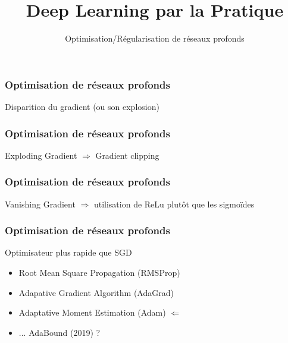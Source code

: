 \documentclass{formation}
\title{Deep Learning par la Pratique}
\subtitle{Optimisation/Régularisation de réseaux profonds}
\begin{document}
\maketitle

\begin{frame}
  \frametitle{Optimisation de réseaux profonds}
  Disparition du gradient (ou son explosion)
\end{frame}

\begin{frame}
  \frametitle{Optimisation de réseaux profonds}
  Exploding Gradient $\Rightarrow$ Gradient clipping
\end{frame}

\begin{frame}
  \frametitle{Optimisation de réseaux profonds}
  Vanishing Gradient $\Rightarrow$ utilisation de ReLu plutôt que les sigmoïdes
\end{frame}

\begin{frame}
  \frametitle{Optimisation de réseaux profonds}
  Optimisateur plus rapide que SGD
  \begin{itemize}
  \item Root Mean Square Propagation (RMSProp)
  \item Adapative Gradient Algorithm (AdaGrad)
  \item Adaptative Moment Estimation (Adam)    $\Leftarrow$
  \item ... AdaBound (2019) ?
 \end{itemize}
\end{frame}
\end{document}
